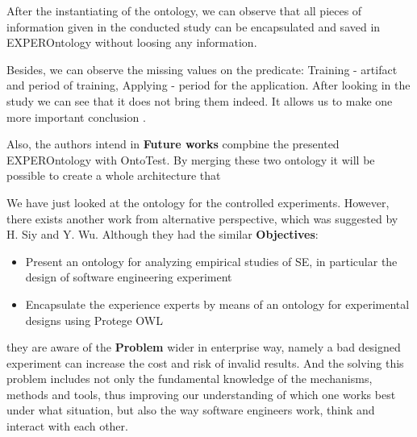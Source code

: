 	 After the instantiating of the ontology, we can observe that all pieces of information given in the conducted study can be encapsulated and saved in EXPEROntology without loosing any information.
	 
	 Besides, we can observe the missing values on the predicate: Training - artifact and period of training, Applying - period for the application. After looking in the study we can see that it does not bring them indeed. It allows us to make one more important conclusion \frqq\cite[p. 6]{Gar08}. 
	 
	 Also, the authors intend in \textbf{Future works} compbine the presented EXPEROntology with OntoTest. By merging these two ontology it will be possible to create a whole architecture that \frqq\cite[p.6]{Gar08}
	 \newline
	 
	 We have just looked at the ontology for the controlled experiments. However, there exists another work from alternative perspective, which was suggested by H. Siy and Y. Wu\cite{SiyWu12}. Although they had the similar \textbf{Objectives}:
	  \begin{itemize}
	 	\item Present an ontology for analyzing empirical studies of SE, in particular the design of software engineering experiment
	 	\item Encapsulate the experience experts by means of an ontology for experimental designs using Protege OWL
	 \end{itemize}
	they are aware of the \textbf{Problem} wider in enterprise way, namely a bad designed experiment can increase the cost and risk of invalid results. And the solving this problem includes not only the fundamental knowledge of the mechanisms, methods and tools,
	thus improving our understanding of which one works best under what situation, but also the way software engineers work, think and interact with each other.
	
